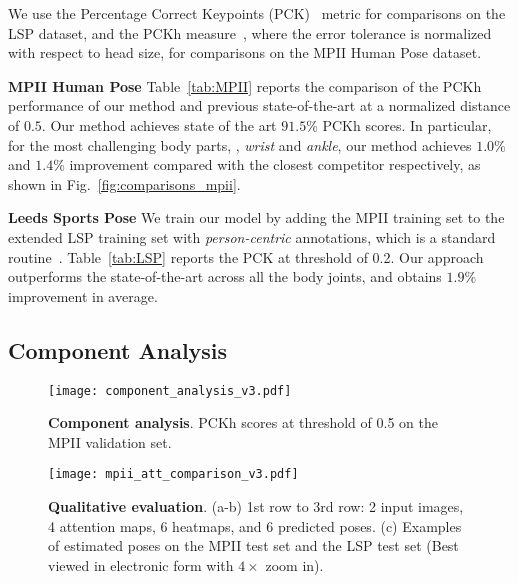 \documentclass[10pt,twocolumn,letterpaper]{article}
\newcommand{\smalltitle}[1]{\vspace{0.2em}\noindent \textbf{{#1}}}
\begin{document}
We use the Percentage Correct Keypoints (PCK)~\cite{yang2013articulated}  metric for comparisons on the LSP dataset, and the PCKh measure~\cite{andriluka20142d}, where the error tolerance is normalized with respect to head size, for comparisons on the MPII Human Pose dataset. 



\smalltitle{MPII Human Pose}  
Table~\ref{tab:MPII} reports the comparison of the PCKh performance of our method and previous state-of-the-art at a normalized distance of $0.5$. Our method achieves state of the art $91.5\%$ PCKh scores. In particular, for the most challenging body parts, \eg, \textit{wrist} and \textit{ankle}, our method achieves $1.0\%$ and $1.4\%$ improvement compared with the closest competitor respectively, as shown in Fig.~\ref{fig:comparisons_mpii}.





\smalltitle{Leeds Sports Pose} 
We train our model by adding the MPII training set to the extended LSP training set with \textit{person-centric} annotations, which is a standard routine~\cite{wei2016convolutional,insafutdinov2016deepercut,pishchulin2016deepcut,lifshitz2016human, belagiannis2016recurrent}. Table~\ref{tab:LSP} reports the PCK at threshold of 0.2. Our approach outperforms the state-of-the-art across all the body joints, and obtains $1.9\%$ improvement in average.


\subsection{Component Analysis}


\begin{figure} \begin{center}
    \texttt{[image: component\_analysis\_v3.pdf]}
  \end{center}
    \vspace{-2em}
  \caption{\small \textbf{Component analysis}. PCKh scores at threshold of 0.5 on the MPII validation set. }
    \vspace{-1.5 em}
  \label{fig:component_analysis}
\end{figure}


\begin{figure*} \begin{center}
  \texttt{[image: mpii\_att\_comparison\_v3.pdf]}
\end{center}
\vspace{-1.5em}
   \caption{\small \textbf{Qualitative evaluation}. (a-b) 1st row to 3rd row: 2 input images, 4 attention maps, 6 heatmaps, and 6 predicted poses. (c) Examples of estimated poses on the MPII test set and the LSP test set (Best viewed in electronic form with $4\times$ zoom in).}
\vspace{-1em}
\label{fig:mpii_att_comparison}
\end{figure*}
\end{document}
